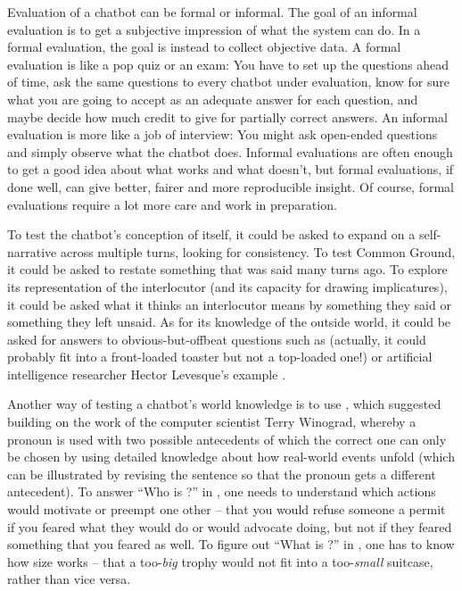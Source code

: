 Evaluation of a chatbot can be formal or informal. The goal of an informal evaluation is to get a subjective impression of what the system can do. In a formal evaluation, the goal is instead to collect objective data. A formal evaluation is like a pop quiz or an exam: You have to set up the questions ahead of time, ask the same questions to every chatbot under evaluation, know for sure what you are going to accept as an adequate answer for each question, and maybe decide how much credit to give for partially correct answers. An informal evaluation is more like a job of interview: You might ask open-ended questions and simply observe what the chatbot does. Informal evaluations are often enough to get a good idea about what works and what doesn't, but formal evaluations, if done well, can give better, fairer and more reproducible insight. Of course, formal evaluations require a lot more care and work in preparation.


To test the chatbot's conception of itself, it could be asked to expand on a self-narrative across multiple turns, looking for consistency.  To test  Common Ground, it could be asked to restate something that was said many turns ago.  To explore its representation of the interlocutor (and its capacity for drawing implicatures), it could be asked what it thinks an interlocutor means by something they said or something they left unsaid.  As for its knowledge of the outside world, it could be asked for answers to obvious-but-offbeat questions such as  (actually, it could probably fit into a front-loaded toaster but not a top-loaded one!) or artificial intelligence researcher Hector Levesque's example  \citep{Levesque:2014}.  

Another way of testing a chatbot's world knowledge is to use , which  \citet{Levesque-etal:2012} suggested building on the work of the computer scientist Terry Winograd, whereby a pronoun is used with two possible antecedents of which the correct one can only be chosen by using detailed knowledge about how real-world events unfold (which can be illustrated by revising the sentence so that the pronoun gets a different antecedent).  To answer ``Who is ?'' in , one needs to understand which actions would motivate or preempt one other -- that you would refuse someone a permit if you feared what they would do or would advocate doing, but not if they feared something that you feared as well.  To figure out ``What is ?'' in , one has to know how size works -- that a too-\emph{big} trophy would not fit into a too-\emph{small} suitcase, rather than vice versa.


